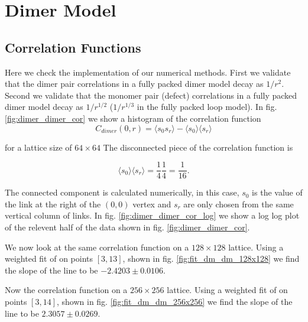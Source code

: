 \documentclass[aps,floatfix,11pt]{revtex4-1}
\begin{document}
\section{Dimer Model}

\subsection{Correlation Functions}

Here we check the implementation of our numerical methods. First we validate that the dimer pair
correlations in a fully packed dimer model decay as $1/r^2$. Second we validate that the monomer
pair (defect) correlations in a fully packed dimer model decay as $1/r^{1/2}$ ($1/r^{1/3}$ in the
fully packed loop model). In fig. \ref{fig:dimer_dimer_cor} we show a histogram of the correlation
function 
\begin{equation}
    \label{}
    C_{dimer}(0,r) = \langle s_0 s_r \rangle -\langle s_0 \rangle \langle s_r \rangle
\end{equation}

\noindent
for a lattice size of $64\times 64$ The disconnected piece of the correlation function is

\begin{equation}
    \label{}
    \langle s_0 \rangle \langle s_r \rangle = \frac{1}{4}\frac{1}{4} = \frac{1}{16}.
\end{equation}

\noindent
The connected component is calculated numerically, in this case, $s_0$ is the value of the link at the
right of the $(0,0)$ vertex and $s_r$ are only chosen from the same vertical column of links.
In fig. \ref{fig:dimer_dimer_cor_log} we show a log log plot of the relevent half of the data
shown in fig. \ref{fig:dimer_dimer_cor}. 

We now look at the same correlation function on a $128\times128$ lattice.
Using a weighted fit of on points $[3,13]$, shown in fig.
\ref{fig:fit_dm_dm_128x128} we find the slope of the line to be $-2.4203\pm 0.0106$.

Now the correlation function on a $256\times256$ lattice.
Using a weighted fit of on points $[3,14]$, shown in fig.
\ref{fig:fit_dm_dm_256x256} we find the slope of the line to be $2.3057\pm 0.0269$.
\end{document}
